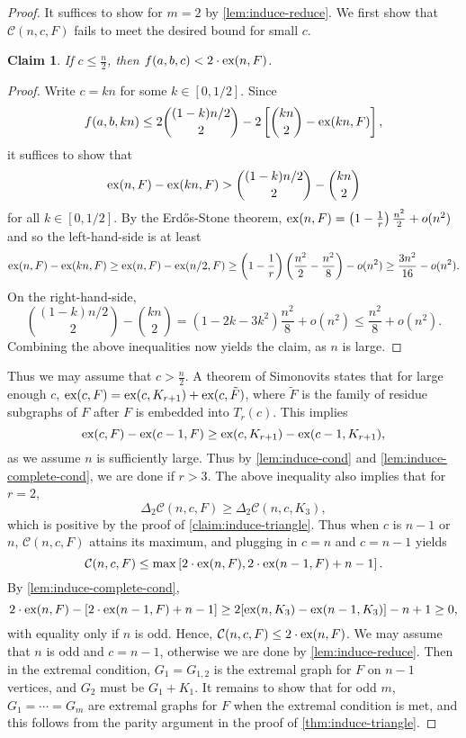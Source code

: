 \documentclass[12pt]{report}
\newtheorem{claim}{Claim}[theorem]
\newcommand*{\ex}{\textnormal{ex}}
\newcommand*{\con}{\mathcal{C}}
\begin{document}
\begin{proof}
  It suffices to show for $m = 2$ by \cref{lem:induce-reduce}. We first show that $\con(n, c, F)$ fails to meet the desired bound for small $c$.
  \begin{claim}
    If $c \leq \frac{n}{2}$, then $f(a, b, c) < 2 \cdot \ex(n, F)$.
  \end{claim}

  \begin{proof}
    Write $c = kn$ for some $k \in [0, 1/2]$. Since
    \[
      f(a, b, kn) \leq 2\binom{(1 - k)n/2}{2} - 2\left[\binom{kn}{2} - \ex(kn, F)\right],
    \]
    it suffices to show that
    \[
      \ex(n, F) - \ex(kn, F) > \binom{(1 - k)n/2}{2} - \binom{kn}{2}
    \]
    for all $k \in [0, 1/2]$. By the Erdős-Stone theorem, $\ex(n, F) = \left(1 - \frac{1}{r}\right)\frac{n^2}{2} + o(n^2)$ and so the left-hand-side is at least
    \[
      \ex(n, F) - \ex(kn, F) \geq \ex(n, F) - \ex(n/2, F) \geq \left(1 - \frac{1}{r}\right)\left(\frac{n^2}{2} - \frac{n^2}{8}\right) - o(n^2) \geq \frac{3n^2}{16} - o(n^2).
    \]
    On the right-hand-side, 
    \[
      \binom{(1 - k)n/2}{2} - \binom{kn}{2} = (1 - 2k - 3k^2)\frac{n^2}{8} + o(n^2) \leq \frac{n^2}{8} + o(n^2).
    \]
    Combining the above inequalities now yields the claim, as $n$ is large.
  \end{proof}

  Thus we may assume that $c > \frac{n}{2}$. A theorem of Simonovits states that for large enough $c$, $\ex(c, F) = \ex(c, K_{r + 1}) + \ex(c, \tilde{F})$, where $\tilde{F}$ is the family of residue subgraphs of $F$ after $F$ is embedded into $T_r(c)$. This implies
  \[
    \ex(c, F) - \ex(c - 1, F) \geq \ex(c, K_{r + 1}) - \ex(c - 1, K_{r + 1}),
  \]
  as we assume $n$ is sufficiently large. Thus by \cref{lem:induce-cond} and \cref{lem:induce-complete-cond}, we are done if $r > 3$. The above inequality also implies that for $r = 2$,
  \[
    \Delta_2 \con(n, c, F) \geq \Delta_2 \con(n, c, K_3),
  \]
  which is positive by the proof of \cref{claim:induce-triangle}. Thus when $c$ is $n - 1$ or $n$, $\con(n, c, F)$ attains its maximum, and plugging in $c = n$ and $c = n -1$ yields 
  \[
    \con(n, c, F) \leq \max\left[2 \cdot \ex(n, F), 2 \cdot \ex(n - 1, F) + n - 1\right].
  \]
  By \cref{lem:induce-complete-cond},
  \[
    2 \cdot \ex(n, F) - [2 \cdot \ex(n - 1, F) + n - 1] \geq 2[\ex(n, K_{3}) - \ex(n - 1, K_{3})] - n + 1 \geq 0,
  \]
  with equality only if $n$ is odd. Hence, $\con(n, c, F) \leq 2 \cdot \ex(n, F)$. We may assume that $n$ is odd and $c = n - 1$, otherwise we are done by \cref{lem:induce-reduce}. Then in the extremal condition, $G_1 = G_{1, 2}$ is the extremal graph for $F$ on $n - 1$ vertices, and $G_2$ must be $G_1 + K_1$. It remains to show that for odd $m$, $G_1 = \cdots = G_m$ are extremal graphs for $F$ when the extremal condition is met, and this follows from the parity argument in the proof of \cref{thm:induce-triangle}.
\end{proof}
\end{document}
